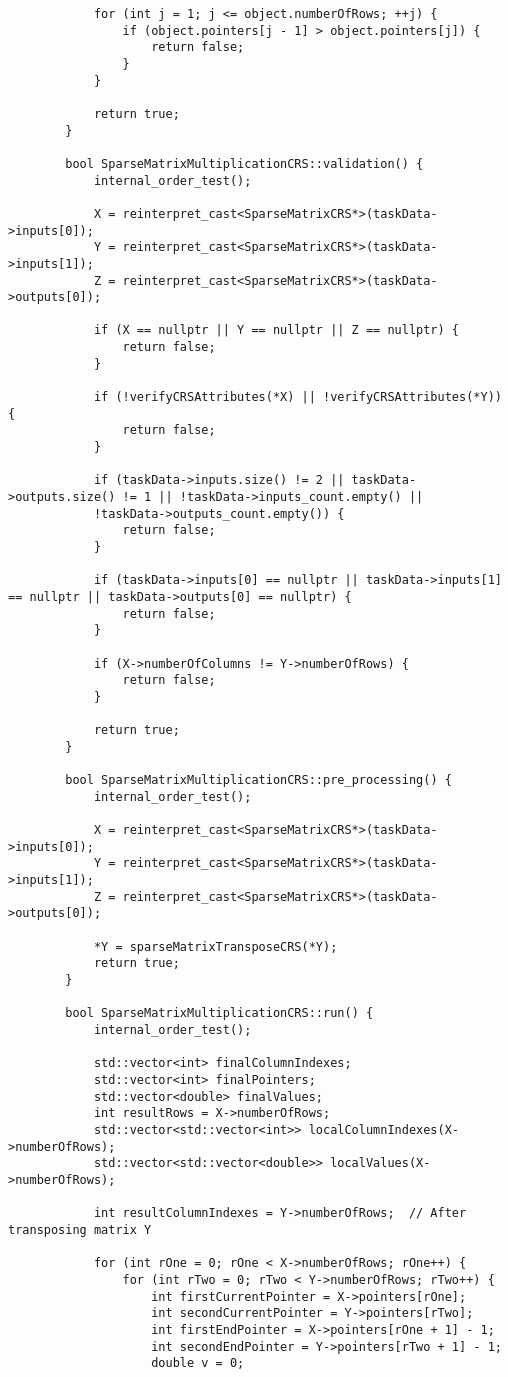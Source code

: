\documentclass[a4paper, 14pt]{article}
\begin{document}
\begin{verbatim}
			for (int j = 1; j <= object.numberOfRows; ++j) {
				if (object.pointers[j - 1] > object.pointers[j]) {
					return false;
				}
			}
			
			return true;
		}
		
		bool SparseMatrixMultiplicationCRS::validation() {
			internal_order_test();
			
			X = reinterpret_cast<SparseMatrixCRS*>(taskData->inputs[0]);
			Y = reinterpret_cast<SparseMatrixCRS*>(taskData->inputs[1]);
			Z = reinterpret_cast<SparseMatrixCRS*>(taskData->outputs[0]);
			
			if (X == nullptr || Y == nullptr || Z == nullptr) {
				return false;
			}
			
			if (!verifyCRSAttributes(*X) || !verifyCRSAttributes(*Y)) {
				return false;
			}
			
			if (taskData->inputs.size() != 2 || taskData->outputs.size() != 1 || !taskData->inputs_count.empty() ||
			!taskData->outputs_count.empty()) {
				return false;
			}
			
			if (taskData->inputs[0] == nullptr || taskData->inputs[1] == nullptr || taskData->outputs[0] == nullptr) {
				return false;
			}
			
			if (X->numberOfColumns != Y->numberOfRows) {
				return false;
			}
			
			return true;
		}
		
		bool SparseMatrixMultiplicationCRS::pre_processing() {
			internal_order_test();
			
			X = reinterpret_cast<SparseMatrixCRS*>(taskData->inputs[0]);
			Y = reinterpret_cast<SparseMatrixCRS*>(taskData->inputs[1]);
			Z = reinterpret_cast<SparseMatrixCRS*>(taskData->outputs[0]);
			
			*Y = sparseMatrixTransposeCRS(*Y);
			return true;
		}
		
		bool SparseMatrixMultiplicationCRS::run() {
			internal_order_test();
			
			std::vector<int> finalColumnIndexes;
			std::vector<int> finalPointers;
			std::vector<double> finalValues;
			int resultRows = X->numberOfRows;
			std::vector<std::vector<int>> localColumnIndexes(X->numberOfRows);
			std::vector<std::vector<double>> localValues(X->numberOfRows);
			
			int resultColumnIndexes = Y->numberOfRows;  // After transposing matrix Y
			
			for (int rOne = 0; rOne < X->numberOfRows; rOne++) {
				for (int rTwo = 0; rTwo < Y->numberOfRows; rTwo++) {
					int firstCurrentPointer = X->pointers[rOne];
					int secondCurrentPointer = Y->pointers[rTwo];
					int firstEndPointer = X->pointers[rOne + 1] - 1;
					int secondEndPointer = Y->pointers[rTwo + 1] - 1;
					double v = 0;
					

\end{verbatim}
\end{document}
